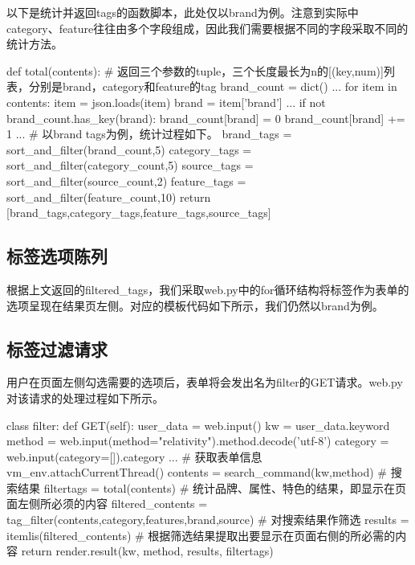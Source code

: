 以下是统计并返回tags的函数脚本，此处仅以brand为例。注意到实际中category、feature往往由多个字段组成，因此我们需要根据不同的字段采取不同的统计方法。

\begin{python}
def total(contents):
    # 返回三个参数的tuple，三个长度最长为n的[(key,num)]列表，分别是brand，category和feature的tag
    brand_count = dict()
    ...
    for item in contents:
        item = json.loads(item)
        brand = item['brand']
        ...
        if not brand_count.has_key(brand):
            brand_count[brand] = 0
        brand_count[brand] += 1
        ...
    # 以brand tags为例，统计过程如下。
    brand_tags = sort_and_filter(brand_count,5)
    category_tags = sort_and_filter(category_count,5)
    source_tags = sort_and_filter(source_count,2)
    feature_tags = sort_and_filter(feature_count,10)
    return [brand_tags,category_tags,feature_tags,source_tags]
\end{python}


\subsection{标签选项陈列}

根据上文返回的filtered\_tags，我们采取web.py中的for循环结构将标签作为表单的选项呈现在结果页左侧。对应的模板代码如下所示，我们仍然以brand为例。


\subsection{标签过滤请求}

用户在页面左侧勾选需要的选项后，表单将会发出名为filter的GET请求。web.py对该请求的处理过程如下所示。


\begin{python}
class filter:
    def GET(self):
        user_data = web.input()
        kw = user_data.keyword
        method = web.input(method="relativity").method.decode('utf-8')
        category = web.input(category=[]).category
        ... # 获取表单信息
        vm_env.attachCurrentThread()
        contents = search_command(kw,method) # 搜索结果
        filtertags = total(contents) # 统计品牌、属性、特色的结果，即显示在页面左侧所必须的内容
        filtered_contents = tag_filter(contents,category,features,brand,source)
                                     # 对搜索结果作筛选
        results = itemlis(filtered_contents) # 根据筛选结果提取出要显示在页面右侧的所必需的内容
        return render.result(kw, method, results, filtertags)
\end{python}

